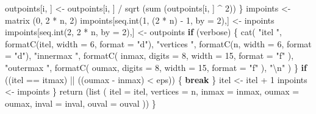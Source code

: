 \documentclass[
  12pt,
]{book}
\newenvironment{Shaded}{\begin{snugshade}}{\end{snugshade}}
\newcommand{\AttributeTok}[1]{\textcolor[rgb]{0.77,0.63,0.00}{#1}}
\newcommand{\ControlFlowTok}[1]{\textcolor[rgb]{0.13,0.29,0.53}{\textbf{#1}}}
\newcommand{\DecValTok}[1]{\textcolor[rgb]{0.00,0.00,0.81}{#1}}
\newcommand{\FunctionTok}[1]{\textcolor[rgb]{0.00,0.00,0.00}{#1}}
\newcommand{\NormalTok}[1]{#1}
\newcommand{\OtherTok}[1]{\textcolor[rgb]{0.56,0.35,0.01}{#1}}
\newcommand{\SpecialCharTok}[1]{\textcolor[rgb]{0.00,0.00,0.00}{#1}}
\newcommand{\StringTok}[1]{\textcolor[rgb]{0.31,0.60,0.02}{#1}}
\theoremstyle{definition}
\theoremstyle{definition}
\theoremstyle{definition}
\theoremstyle{definition}
\theoremstyle{remark}
\begin{document}
\begin{Shaded}
\begin{Highlighting}[]
\NormalTok{        outpoints[i, ] }\OtherTok{\textless{}{-}}\NormalTok{ outpoints[i, ] }\SpecialCharTok{/} \FunctionTok{sqrt}\NormalTok{ (}\FunctionTok{sum}\NormalTok{ (outpoints[i, ] }\SpecialCharTok{\^{}} \DecValTok{2}\NormalTok{))}
\NormalTok{      \}}
\NormalTok{      impoints }\OtherTok{\textless{}{-}} \FunctionTok{matrix}\NormalTok{ (}\DecValTok{0}\NormalTok{, }\DecValTok{2} \SpecialCharTok{*}\NormalTok{ n, }\DecValTok{2}\NormalTok{)}
\NormalTok{      impoints[}\FunctionTok{seq.int}\NormalTok{(}\DecValTok{1}\NormalTok{, (}\DecValTok{2} \SpecialCharTok{*}\NormalTok{ n) }\SpecialCharTok{{-}} \DecValTok{1}\NormalTok{, }\AttributeTok{by =} \DecValTok{2}\NormalTok{),] }\OtherTok{\textless{}{-}}\NormalTok{ inpoints}
\NormalTok{      impoints[}\FunctionTok{seq.int}\NormalTok{(}\DecValTok{2}\NormalTok{, }\DecValTok{2} \SpecialCharTok{*}\NormalTok{ n, }\AttributeTok{by =} \DecValTok{2}\NormalTok{),] }\OtherTok{\textless{}{-}}\NormalTok{ outpoints}
      \ControlFlowTok{if}\NormalTok{ (verbose) \{}
        \FunctionTok{cat}\NormalTok{(}
          \StringTok{"itel "}\NormalTok{,}
          \FunctionTok{formatC}\NormalTok{(itel, }\AttributeTok{width =} \DecValTok{6}\NormalTok{, }\AttributeTok{format =} \StringTok{"d"}\NormalTok{),}
          \StringTok{"vertices "}\NormalTok{,}
          \FunctionTok{formatC}\NormalTok{(n, }\AttributeTok{width =} \DecValTok{6}\NormalTok{, }\AttributeTok{format =} \StringTok{"d"}\NormalTok{),}
          \StringTok{"innermax "}\NormalTok{,}
          \FunctionTok{formatC}\NormalTok{(}
\NormalTok{            inmax,}
            \AttributeTok{digits =} \DecValTok{8}\NormalTok{,}
            \AttributeTok{width =} \DecValTok{15}\NormalTok{,}
            \AttributeTok{format =} \StringTok{"f"}
\NormalTok{          ),}
          \StringTok{"outermax "}\NormalTok{,}
          \FunctionTok{formatC}\NormalTok{(}
\NormalTok{            oumax,}
            \AttributeTok{digits =} \DecValTok{8}\NormalTok{,}
            \AttributeTok{width =} \DecValTok{15}\NormalTok{,}
            \AttributeTok{format =} \StringTok{"f"}
\NormalTok{          ),}
          \StringTok{"}\SpecialCharTok{\textbackslash{}n}\StringTok{"}
\NormalTok{        )}
\NormalTok{      \}}
      \ControlFlowTok{if}\NormalTok{ ((itel }\SpecialCharTok{==}\NormalTok{ itmax) }\SpecialCharTok{||}\NormalTok{ ((oumax }\SpecialCharTok{{-}}\NormalTok{ inmax) }\SpecialCharTok{\textless{}}\NormalTok{ eps)) \{}
        \ControlFlowTok{break}
\NormalTok{      \}}
\NormalTok{      itel }\OtherTok{\textless{}{-}}\NormalTok{ itel }\SpecialCharTok{+} \DecValTok{1}
\NormalTok{      inpoints }\OtherTok{\textless{}{-}}\NormalTok{ impoints}
\NormalTok{    \}}
    \FunctionTok{return}\NormalTok{ (}\FunctionTok{list}\NormalTok{ (}
      \AttributeTok{itel =}\NormalTok{ itel,}
      \AttributeTok{vertices =}\NormalTok{ n,}
      \AttributeTok{inmax =}\NormalTok{ inmax,}
      \AttributeTok{oumax =}\NormalTok{ oumax,}
      \AttributeTok{inval =}\NormalTok{ inval,}
      \AttributeTok{ouval =}\NormalTok{ ouval}
\NormalTok{    ))}
\NormalTok{  \}}
\end{Highlighting}
\end{Shaded}
\end{document}
